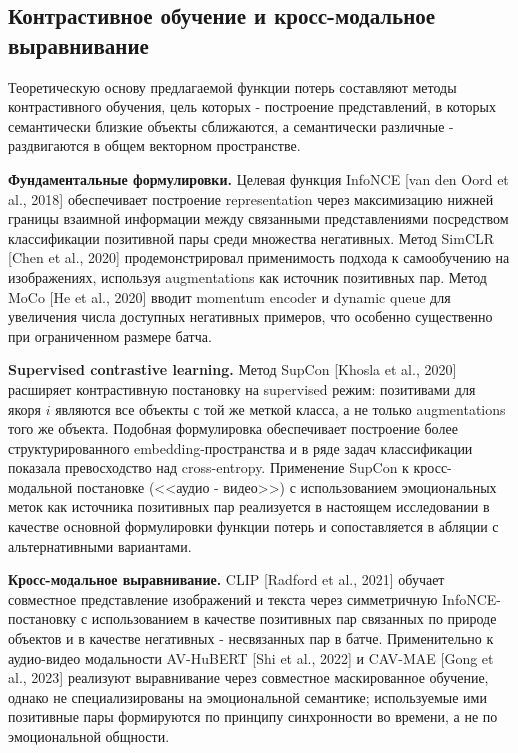 \documentclass[a4paper, 12pt, oneside, openany]{article}
\begin{document}
\subsection{Контрастивное обучение и кросс-модальное выравнивание}

Теоретическую основу предлагаемой функции потерь составляют методы контрастивного обучения, цель которых - построение представлений, в которых семантически близкие объекты сближаются, а семантически различные - раздвигаются в общем векторном пространстве.

\textbf{Фундаментальные формулировки.} Целевая функция InfoNCE [van den Oord et al., 2018] обеспечивает построение representation через максимизацию нижней границы взаимной информации между связанными представлениями посредством классификации позитивной пары среди множества негативных. Метод SimCLR [Chen et al., 2020] продемонстрировал применимость подхода к самообучению на изображениях, используя augmentations как источник позитивных пар. Метод MoCo [He et al., 2020] вводит momentum encoder и dynamic queue для увеличения числа доступных негативных примеров, что особенно существенно при ограниченном размере батча.

\textbf{Supervised contrastive learning.} Метод SupCon [Khosla et al., 2020] расширяет контрастивную постановку на supervised режим: позитивами для якоря $i$ являются все объекты с той же меткой класса, а не только augmentations того же объекта. Подобная формулировка обеспечивает построение более структурированного embedding-пространства и в ряде задач классификации показала превосходство над cross-entropy. Применение SupCon к кросс-модальной постановке (<<аудио - видео>>) с использованием эмоциональных меток как источника позитивных пар реализуется в настоящем исследовании в качестве основной формулировки функции потерь и сопоставляется в абляции с альтернативными вариантами.

\textbf{Кросс-модальное выравнивание.} CLIP [Radford et al., 2021] обучает совместное представление изображений и текста через симметричную InfoNCE-постановку с использованием в качестве позитивных пар связанных по природе объектов и в качестве негативных - несвязанных пар в батче. Применительно к аудио-видео модальности AV-HuBERT [Shi et al., 2022] и CAV-MAE [Gong et al., 2023] реализуют выравнивание через совместное маскированное обучение, однако не специализированы на эмоциональной семантике; используемые ими позитивные пары формируются по принципу синхронности во времени, а не по эмоциональной общности.
\end{document}
